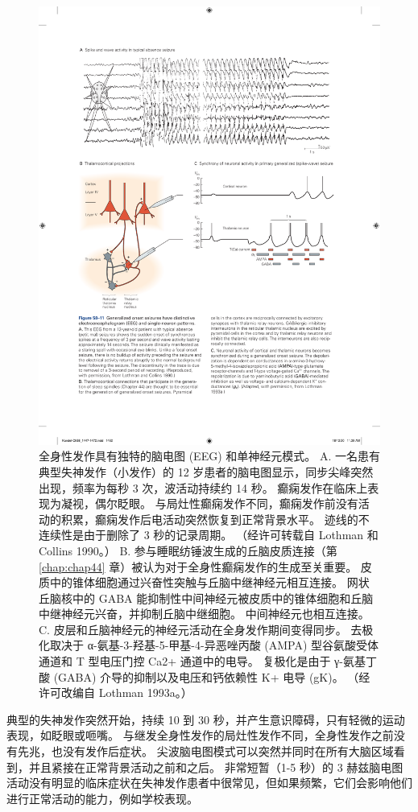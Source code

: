 \begin{figure}[htbp]
	\centering
	\includegraphics[width=0.9\linewidth]{chap58/fig_58_11}
	\caption{全身性发作具有独特的脑电图 (EEG) 和单神经元模式。 A. 一名患有典型失神发作（小发作）的 12 岁患者的脑电图显示，同步尖峰突然出现，频率为每秒 3 次，波活动持续约 14 秒。 癫痫发作在临床上表现为凝视，偶尔眨眼。 与局灶性癫痫发作不同，癫痫发作前没有活动的积累，癫痫发作后电活动突然恢复到正常背景水平。 迹线的不连续性是由于删除了 3 秒的记录周期。 （经许可转载自 Lothman 和 Collins 1990。） B. 参与睡眠纺锤波生成的丘脑皮质连接（第 \ref{chap:chap44} 章）被认为对于全身性癫痫发作的生成至关重要。 皮质中的锥体细胞通过兴奋性突触与丘脑中继神经元相互连接。 网状丘脑核中的 GABA 能抑制性中间神经元被皮质中的锥体细胞和丘脑中继神经元兴奋，并抑制丘脑中继细胞。 中间神经元也相互连接。 C. 皮层和丘脑神经元的神经元活动在全身发作期间变得同步。 去极化取决于 α-氨基-3-羟基-5-甲基-4-异恶唑丙酸 (AMPA) 型谷氨酸受体通道和 T 型电压门控 Ca2+ 通道中的电导。 复极化是由于 γ-氨基丁酸 (GABA) 介导的抑制以及电压和钙依赖性 K+ 电导 (gK)。 （经许可改编自 Lothman 1993a。）}
	\label{fig:58_11}
\end{figure}


典型的失神发作突然开始，持续 10 到 30 秒，并产生意识障碍，只有轻微的运动表现，如眨眼或咂嘴。
与继发全身性发作的局灶性发作不同，全身性发作之前没有先兆，也没有发作后症状。
尖波脑电图模式可以突然并同时在所有大脑区域看到，并且紧接在正常背景活动之前和之后。 非常短暂（1-5 秒）的 3 赫兹脑电图活动没有明显的临床症状在失神发作患者中很常见，但如果频繁，它们会影响他们进行正常活动的能力，例如学校表现。


